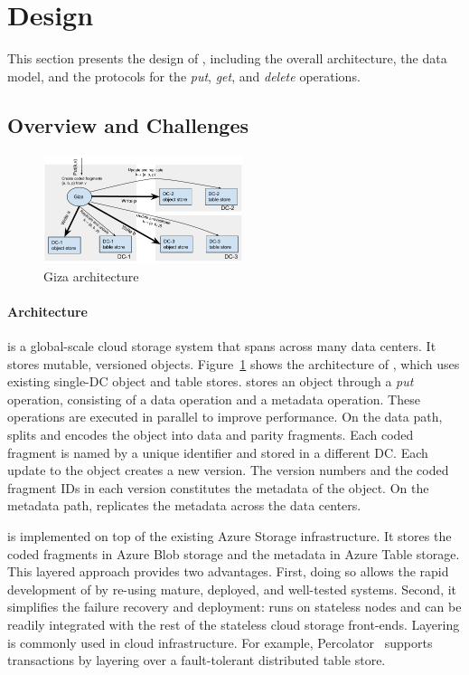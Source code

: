 \section{Design}
\label{sec:design}

This section presents the design of {\name}, including the overall architecture,
the data model, and the protocols for the {\em put}, {\em get}, and {\em delete} operations.

\subsection{Overview and Challenges}

\begin{figure}[htbp]
\centering
\includegraphics[width=0.52\textwidth]{fig/Giza}
\caption{Giza architecture\label{fig:arch}}
\end{figure}

\paragraph{Architecture}
{\name} is a global-scale cloud storage system that spans across many data
centers. It stores mutable, versioned objects. Figure~\ref{fig:arch} shows the
architecture of \name, which uses existing single-DC object and table stores.
\name stores an object through a {\em put} operation, consisting of a data operation and a metadata operation. These operations are executed in parallel to improve performance. On the data path, \name splits and
encodes the object into data and parity fragments.
Each coded fragment is named by a unique identifier and stored in a different DC.
Each update to the object creates a new version. The version
numbers and the coded fragment IDs in each version constitutes the
metadata of the object. On the metadata path, \name replicates the metadata
across the data centers.

\name is implemented on top of the existing Azure Storage infrastructure. It
stores the coded fragments in Azure Blob storage and the metadata in Azure Table
storage. This layered approach provides two advantages. First, doing so allows
the rapid development of \name by re-using mature, deployed, and well-tested
systems. Second, it simplifies the failure recovery and deployment: \name runs
on stateless nodes and can be readily integrated with the rest of the stateless
cloud storage front-ends. Layering is commonly used in cloud infrastructure. For
example, Percolator~\cite{peng12large} supports transactions by layering over a
fault-tolerant distributed table store.

